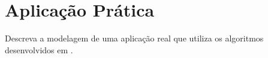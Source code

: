 \section{Aplicação Prática}\label{sec:aplicacao}

Descreva a modelagem de uma aplicação real que utiliza os algoritmos desenvolvidos em .
